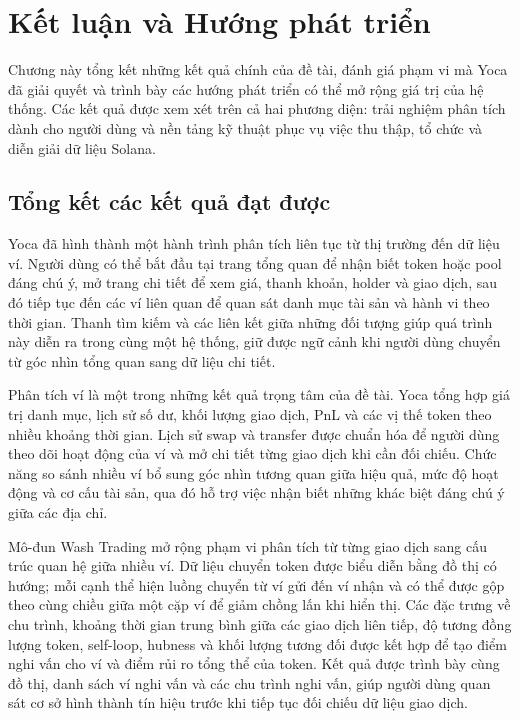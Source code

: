 \chapter{Kết luận và Hướng phát triển}
\label{Chapter5}

Chương này tổng kết những kết quả chính của đề tài, đánh giá phạm vi mà Yoca đã giải quyết và trình bày các hướng phát triển có thể mở rộng giá trị của hệ thống. Các kết quả được xem xét trên cả hai phương diện: trải nghiệm phân tích dành cho người dùng và nền tảng kỹ thuật phục vụ việc thu thập, tổ chức và diễn giải dữ liệu Solana.

\section{Tổng kết các kết quả đạt được}

Yoca đã hình thành một hành trình phân tích liên tục từ thị trường đến dữ liệu ví. Người dùng có thể bắt đầu tại trang tổng quan để nhận biết token hoặc pool đáng chú ý, mở trang chi tiết để xem giá, thanh khoản, holder và giao dịch, sau đó tiếp tục đến các ví liên quan để quan sát danh mục tài sản và hành vi theo thời gian. Thanh tìm kiếm và các liên kết giữa những đối tượng giúp quá trình này diễn ra trong cùng một hệ thống, giữ được ngữ cảnh khi người dùng chuyển từ góc nhìn tổng quan sang dữ liệu chi tiết.

Phân tích ví là một trong những kết quả trọng tâm của đề tài. Yoca tổng hợp giá trị danh mục, lịch sử số dư, khối lượng giao dịch, PnL và các vị thế token theo nhiều khoảng thời gian. Lịch sử swap và transfer được chuẩn hóa để người dùng theo dõi hoạt động của ví và mở chi tiết từng giao dịch khi cần đối chiếu. Chức năng so sánh nhiều ví bổ sung góc nhìn tương quan giữa hiệu quả, mức độ hoạt động và cơ cấu tài sản, qua đó hỗ trợ việc nhận biết những khác biệt đáng chú ý giữa các địa chỉ.

Mô-đun Wash Trading mở rộng phạm vi phân tích từ từng giao dịch sang cấu trúc quan hệ giữa nhiều ví. Dữ liệu chuyển token được biểu diễn bằng đồ thị có hướng; mỗi cạnh thể hiện luồng chuyển từ ví gửi đến ví nhận và có thể được gộp theo cùng chiều giữa một cặp ví để giảm chồng lấn khi hiển thị. Các đặc trưng về chu trình, khoảng thời gian trung bình giữa các giao dịch liên tiếp, độ tương đồng lượng token, self-loop, hubness và khối lượng tương đối được kết hợp để tạo điểm nghi vấn cho ví và điểm rủi ro tổng thể của token. Kết quả được trình bày cùng đồ thị, danh sách ví nghi vấn và các chu trình nghi vấn, giúp người dùng quan sát cơ sở hình thành tín hiệu trước khi tiếp tục đối chiếu dữ liệu giao dịch.

